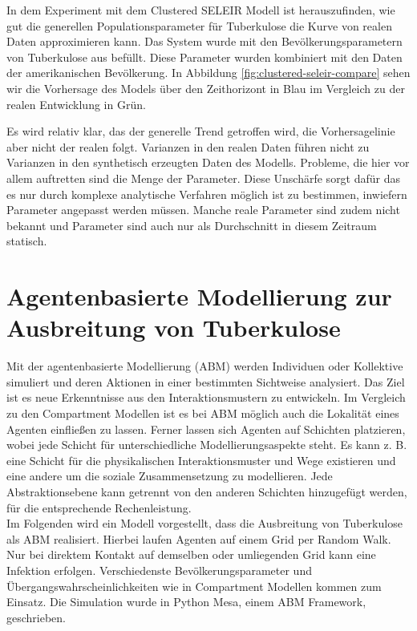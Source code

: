 \documentclass[paper=a4, fontsize=11pt, ngerman, abstract=on]{scrartcl}
\numberwithin{equation}{section} %
\numberwithin{figure}{section} %
\numberwithin{table}{section} %
\begin{document}
In dem Experiment mit dem Clustered SELEIR Modell ist herauszufinden, wie gut die generellen Populationsparameter für Tuberkulose die Kurve von realen Daten approximieren kann. Das System wurde mit den Bevölkerungsparametern von Tuberkulose aus \cite{Trauer2014} befüllt. Diese Parameter wurden kombiniert mit den Daten der amerikanischen Bevölkerung. In Abbildung \ref{fig:clustered-seleir-compare} sehen wir die Vorhersage des Models über den Zeithorizont in Blau im Vergleich zu der realen Entwicklung in Grün.

Es wird relativ klar, das der generelle Trend getroffen wird, die Vorhersagelinie aber nicht der realen folgt. Varianzen in den realen Daten führen nicht zu Varianzen in den synthetisch erzeugten Daten des Modells. Probleme, die hier vor allem auftretten sind die Menge der Parameter. Diese Unschärfe sorgt dafür das es nur durch komplexe analytische Verfahren möglich ist zu bestimmen, inwiefern Parameter angepasst werden müssen. Manche reale Parameter sind zudem nicht bekannt und Parameter sind auch nur als Durchschnitt in diesem Zeitraum statisch.

\section{Agentenbasierte Modellierung zur Ausbreitung von Tuberkulose}

Mit der agentenbasierte Modellierung (ABM) werden Individuen oder Kollektive simuliert und deren Aktionen in einer bestimmten Sichtweise analysiert. Das Ziel ist es neue Erkenntnisse aus den Interaktionsmustern zu entwickeln. Im Vergleich zu den Compartment Modellen ist es bei ABM möglich auch die Lokalität eines Agenten einfließen zu lassen. Ferner lassen sich Agenten auf Schichten platzieren, wobei jede Schicht für unterschiedliche Modellierungsaspekte steht. Es kann z. B. eine Schicht für die physikalischen Interaktionsmuster und Wege existieren und eine andere um die soziale Zusammensetzung zu modellieren. Jede Abstraktionsebene kann getrennt von den anderen Schichten hinzugefügt werden, für die entsprechende Rechenleistung. \\

Im Folgenden wird ein Modell vorgestellt, dass die Ausbreitung von Tuberkulose als ABM realisiert. Hierbei laufen Agenten auf einem Grid per Random Walk. Nur bei direktem Kontakt auf demselben oder umliegenden Grid kann eine Infektion erfolgen. Verschiedenste Bevölkerungsparameter und Übergangswahrscheinlichkeiten wie in Compartment Modellen kommen zum Einsatz. Die Simulation wurde in Python Mesa, einem ABM Framework, geschrieben.
\end{document}
